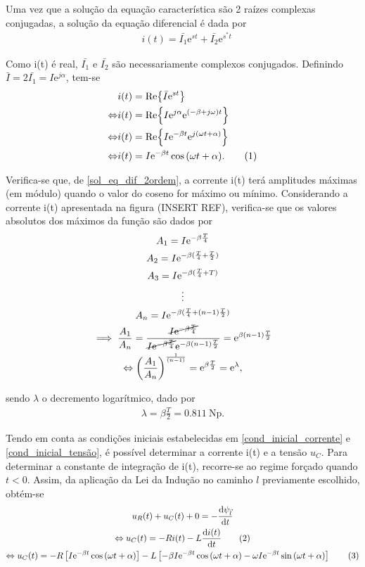 \documentclass[a4paper, titlepage, portuguese]{article}
\newcommand{\eq}{\Leftrightarrow} %
\newcommand\numberthis{\addtocounter{equation}{1}\tag{\theequation}}
\newcommand\e{\mathrm{e} }
\begin{document}
		Uma vez que a solução da equação característica são 2 raízes complexas conjugadas, a solução da equação diferencial é dada por
		\begin{align*}
			&i(t) = \bar{I_1}\e^{st} + \bar{I_2}\e^{s^{*}t}
		\end{align*}

		Como i(t) é real, $\bar{I_{1}}$ e $\bar{I_{2}}$ são necessariamente complexos conjugados. Definindo $\bar{I} = 2\bar{I_1} = I\e^{j\alpha}$, tem-se
		\begin{align*}
			& i(t) = \Re{\bar{I}\e^{st}} \\ \eq
			& i(t) = \Re{I\e^{j\alpha}\e^{(-\beta + j\omega)t}} \\ \eq
			& i(t) = \Re{I\e^{-\beta t}\e^{j(\omega t + \alpha)}} \\ \eq
			& i(t) = I\e^{-\beta t} \cos{(\omega t + \alpha)}. \numberthis \label{sol_eq_dif_2ordem}
		\end{align*}

		Verifica-se que, de \ref{sol_eq_dif_2ordem}, a corrente i(t) terá amplitudes máximas (em módulo) quando o valor do coseno for máximo ou mínimo. Considerando a corrente i(t) apresentada na figura (INSERT REF), verifica-se que os valores absolutos dos máximos da função são dados por
		\begin{gather*}
			 A_1 = I\e^{-\beta \frac{T}{4}} \\
			 A_2 = I\e^{-\beta(\frac{T}{4} + \frac{T}{2})} \\
			 A_3 = I\e^{-\beta(\frac{T}{4} + T)}\\
			\vdots \\
			 A_n = I\e^{-\beta(\frac{T}{4} + (n-1)\frac{T}{2})} \\
			 \implies \frac{A_1}{A_n} = \frac{\cancel{I\e^{-\beta \frac{T}{4}}}}{\cancel{I\e^{-\beta\frac{T}{4}}} \e^{-\beta(n-1)\frac{T}{2}}} = \e^{\beta(n-1)\frac{T}{2}} \\ \eq
			 \left(\frac{A_1}{A_n}\right)^{\frac{1}{(n-1)}} = \e^{\beta\frac{T}{2}} = \e^\lambda,
		\end{gather*}

		sendo $\lambda$ o decremento logarítmico, dado por
		\begin{align*}
			 \lambda = \beta \frac{T}{2} = \SI{0.811}{\neper}.
		\end{align*}

		Tendo em conta as condições iniciais estabelecidas em \eqref{cond_inicial_corrente} e \eqref{cond_inicial_tensão}, é possível determinar a corrente i(t) e a tensão $u_{C}$. Para determinar a constante de integração de i(t), recorre-se ao regime forçado quando $t < 0$. Assim, da aplicação da Lei da Indução no caminho $l$ previamente escolhido, obtém-se 
		\begin{gather*}
			u_R(t) + u_C(t) + 0 = - \dv{\psi_{\vec{l}}}{t} \\ \eq
			u_C(t) = -Ri(t) - L\dv{i(t)}{t} \numberthis \label{eq_Uc_lei_ind} \\ \eq 
			u_C(t) = -R \left[ I\e^{-\beta t} \cos{(\omega t + \alpha)} \right] - L \left[ -\beta I\e^{-\beta t} \cos{(\omega t + \alpha)} - \omega I\e^{-\beta t} \sin{(\omega t + \alpha)}\right] \numberthis \label{eq_Uc_RLC}
		\end{gather*}
		
\end{document}
